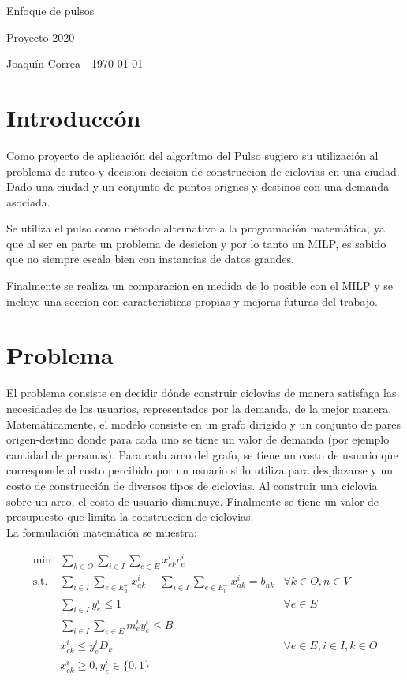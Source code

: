 \documentclass{article}
\begin{document}
  \begin{center}
    {\sc \large Enfoque de pulsos}
    
    {\sc \large Proyecto 2020}
    \linebreak

    {\rm Joaquín Correa - \today}
  \end{center}

  \section*{Introduccón}
  Como proyecto de aplicación del algorítmo del Pulso sugiero su utilización al problema de ruteo y decision decision de construccion de ciclovias en una ciudad. Dado una ciudad y un conjunto de puntos orignes y destinos con una demanda asociada.

  Se utiliza el pulso como método alternativo a la programación matemática, ya que al ser en parte un problema de desicion y por lo tanto un MILP, es sabido que no siempre escala bien con instancias de datos grandes.

  Finalmente se realiza un comparacion en medida de lo posible con el MILP y se incluye una seccion con caracteristicas propias y mejoras futuras del trabajo.
  
  \section*{Problema}
  El problema consiste en decidir dónde construir ciclovias de manera satisfaga las necesidades de los usuarios, representados por la demanda, de la mejor manera. Matemáticamente, el modelo consiste en un grafo dirigido y un conjunto de pares origen-destino donde para cada uno se tiene un valor de demanda (por ejemplo cantidad de personas). Para cada arco del grafo, se tiene un costo de usuario que corresponde al costo percibido por un usuario si lo utiliza para desplazarse y un costo de construcción de diversos tipos de ciclovias. Al construir una ciclovia sobre un arco, el costo de usuario disminuye. Finalmente se tiene un valor de presupuesto que limita la construccion de ciclovias.\\

  La formulación matemática se muestra:

  \begin{align}
    \text{min} & \sum_{k \in O} \sum_{i \in I} \sum_{e \in E} x_{ek}^i c_e^i & \\
    \text{s.t.} & \sum_{i \in I}\sum_{e \in E_n^+} x_{ak}^i - \sum_{i \in I}\sum_{e \in E_n^-} x_{ak}^i = b_{nk} & \forall k \in O, n \in V \\
          & \sum_{i \in I} y_{e}^i \leq 1 & \forall e \in E \\
          & \sum_{i \in I} \sum_{e \in E} m_e^i y_e^i \leq B & \\
          & x_{ek}^i \leq y_e^i  D_k & \forall e \in E, i \in I, k \in O \\
          & x_{ek}^i \geq 0, y_e^i \in \{0,1\} &
  \end{align}
\end{document}

